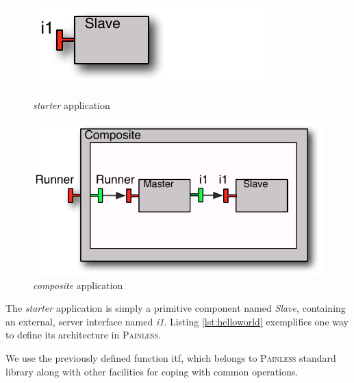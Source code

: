     \begin{figure}[h!]
	\begin{minipage}[b]{0.35\linewidth} 
	\centering
	
		\includegraphics[scale=1]{figures/chapter5/starter.pdf}
		\caption{\textit{starter} application }		
		\label{fig:painlessstarter}

	\end{minipage}
	\hspace{0.25cm}
	\begin{minipage}[b]{0.65\linewidth} 
	\centering
 
		\includegraphics[scale=0.5]{figures/chapter5/composite.pdf}
		\caption{\textit{composite} application }		
		\label{fig:painlesscomposite}
 
	\end{minipage}
	\end{figure}	  		


	\noindent The \textit{starter} application is simply a primitive component named \textit{Slave},
	containing an external, server interface named \textit{i1}. Listing \ref{lst:helloworld} exemplifies one way to define  
	its architecture in \textsc{Painless}.


	
	
	
	\noindent We use the previously defined function \textsf{itf}, which belongs to \textsc{Painless} 
	standard library along with other facilities for coping with common operations.
	
